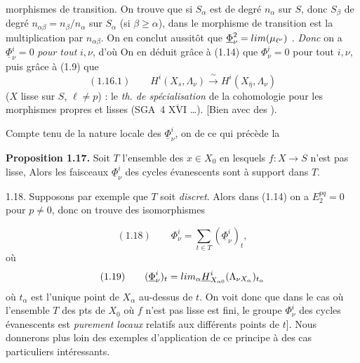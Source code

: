 \documentclass[11pt,a4paper]{article}
\begin{document}

morphismes de transition. On trouve que si $S_\alpha$ est de degré $n_\alpha$ sur $S$, donc $S_\beta$ de degré $n_{\alpha\beta} = n_\beta/n_\alpha$ sur $S_\alpha$ (si $\beta \geq \alpha$),  dans le morphisme de transition est la multiplication par $n_{\alpha\beta}$. On en conclut aussitôt \struck{\ill{} \ill{}} que $\underline{\Phi}^2_\nu = \varinjlim (\mu_{\ell^\nu})$ . \emph{Donc} \struck{\ill{}} on a $\underline{\Phi}^i_\nu = 0$ \emph{pour tout} $i, \nu$, d'où On en déduit grâce à (1.14) que $\Phi^i_\nu = 0$ pour tout $i, \nu$, puis grâce à (1.9) que
\[
(1.16.1) \qquad H^i(X_s, \Lambda_\nu) \xrightarrow{\ \sim\ } H^i(X_{\bar\eta}, \Lambda_\nu)
\]
($X$ lisse sur $S$, \struck{\ill{}} $\ell \neq p$) : \struck{\ill{}} \add{\ill{} \struck{\ill{}} \ill{}} le \emph{th. de spécialisation} de la cohomologie pour les morphismes propres et lisses (SGA~4 $\overline{\text{XVI}}$ …). [Bien \ill{} \ill{} \ill{} avec des \ill{} \ill{}).

Compte tenu de la nature locale des $\underline{\Phi}^i_\nu$, on  de ce qui précède la

\textbf{Proposition 1.17.} Soit $T$ l'ensemble des $x \in X_0$ en lesquels $f : X \to S$  n'est pas lisse,  Alors les faisceaux $\underline{\Phi}^i_\nu$ des cycles évanescents sont à support dans $T$.

1.18. Supposons par exemple que  $T$ soit \emph{discret}. Alors \struck{\ill{}} dans (1.14) on a $E_2^{pq} = 0$ pour $p \neq 0$, donc on trouve des isomorphismes

\[
(1.18) \qquad \Phi^i_\nu = \sum_{t \in T} (\underline{\Phi}^i_\nu)_t ,
\]
où
\[
(1.19) \qquad (\underline{\Phi}^i_\nu)_t = \varinjlim_\alpha \underline{H}^i_{X_{\alpha 0}}(\Lambda_{\nu X_\alpha})_{t_\alpha}
\]
où $t_\alpha$ est l'unique point de $X_\alpha$ au-dessus de $t$. On voit donc que dans le cas où l'ensemble $T$ des pts de $X_0$ où $f$ n'est pas lisse est fini, le  groupe $\Phi^i_\nu$ des cycles évanescents  est  \emph{purement locaux} \struck{\ill{} \ill{}} relatifs aux différents points de $t$]. \struck{\ill{}} Nous donnerons plus loin des exemples d'application de ce principe à des cas particuliers intéressants.
\end{document}
